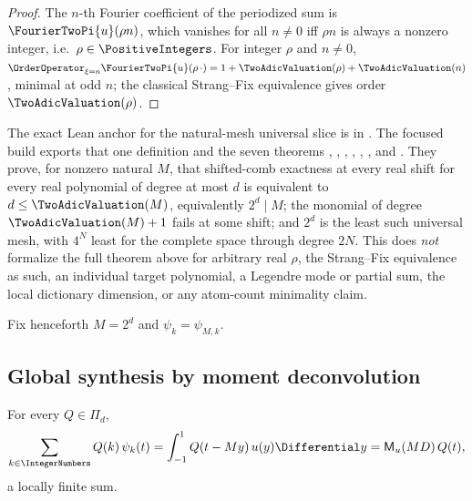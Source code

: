 \documentclass[11pt,oneside]{article}
\numberwithin{equation}{section}
\theoremstyle{definition}
\theoremstyle{remark}
\newcommand{\MM}{\mathsf M}
\newcommand{\PiD}{\Pi_d}
\begin{document}
\begin{proof}
The $n$-th Fourier coefficient of the periodized sum is
$\FourierTwoPi{u}(\rho n)$, which vanishes for all $n\ne0$ iff $\rho n$ is
always a nonzero integer, i.e.\ $\rho\in\PositiveIntegers$.  For integer $\rho$ and
$n\ne0$, $\OrderOperator_{\xi=n}\FourierTwoPi{u}(\rho\,\cdot)
=1+\TwoAdicValuation(\rho)+\TwoAdicValuation(n)$, minimal at odd $n$; the classical
Strang--Fix equivalence \cite{StrangFix1973,Jia1998} gives order
$\TwoAdicValuation(\rho)$.
\end{proof}

The exact Lean anchor for the natural-mesh universal slice is
 in .
The focused build exports that one definition and the seven theorems
,
,
,
,
,
, and
.  They prove, for nonzero natural
$M$, that shifted-comb exactness at every real shift for every real polynomial
of degree at most $d$ is equivalent to $d\le\TwoAdicValuation(M)$, equivalently
$2^d\mid M$; the monomial of degree $\TwoAdicValuation(M)+1$ fails at some shift; and
$2^d$ is the least such universal mesh, with $4^N$ least for the complete
space through degree $2N$.  This does \emph{not} formalize the full theorem
above for arbitrary real $\rho$, the Strang--Fix equivalence as such, an
individual target polynomial, a Legendre mode or partial sum, the local
dictionary dimension, or any atom-count minimality claim.

Fix henceforth $M=2^{d}$ and $\psi_k=\psi_{M,k}$.

\subsection{Global synthesis by moment deconvolution}

\begin{lemma}
\label{lem:poisson-collapse}
For every $Q\in\PiD$,
\begin{equation}
 \sum_{k\in\IntegerNumbers}Q(k)\,\psi_k(t)
 =\int_{-1}^{1}Q(t-My)\,u(y)\Differential y
 =\MM_u(MD)\,Q(t),
 \label{eq:poisson-collapse}
\end{equation}
a locally finite sum.
\end{lemma}
\end{document}
